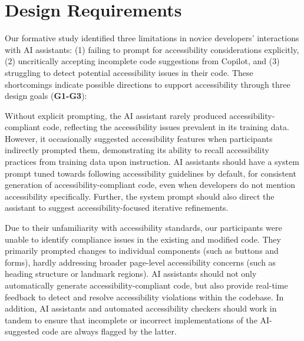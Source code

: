 \section{Design Requirements}
\label{design-goals}
Our formative study identified three limitations in novice developers' interactions with AI assistants: (1) failing to prompt for accessibility considerations explicitly, (2) uncritically accepting incomplete code suggestions from Copilot, and (3) struggling to detect potential accessibility issues in their code. These shortcomings indicate possible directions to support accessibility through three design goals (\textbf{G1-G3}):

Without explicit prompting, the AI assistant rarely produced accessibility-compliant code, reflecting the accessibility issues prevalent in its training data. However, it occasionally suggested accessibility features when participants indirectly prompted them, demonstrating its ability to recall accessibility practices from training data upon instruction. AI assistants should have a system prompt tuned towards following accessibility guidelines by default, for consistent generation of accessibility-compliant code, even when developers do not mention accessibility specifically. Further, the system prompt should also direct the assistant to suggest accessibility-focused iterative refinements.

\begin{highlight}
\end{highlight}
Due to their unfamiliarity with accessibility standards, our participants were unable to identify compliance issues in the existing and modified code. They primarily prompted changes to individual components (such as buttons and forms), hardly addressing broader page-level accessibility concerns (such as heading structure or landmark regions). AI assistants should not only automatically generate accessibility-compliant code, but also provide real-time feedback to detect and resolve accessibility violations within the codebase. In addition, AI assistants and automated accessibility checkers should work in tandem to ensure that incomplete or incorrect implementations of the AI-suggested code are always flagged by the latter.

